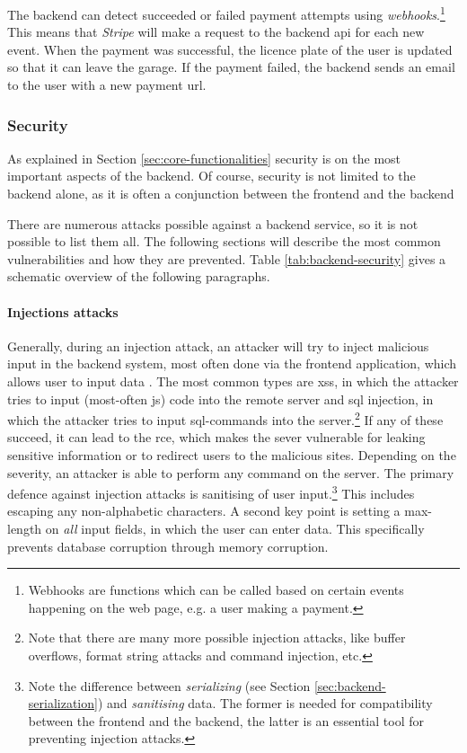 \ind The backend can detect succeeded or failed payment attempts using \textit{webhooks}.\footnote{Webhooks are functions which can be called based on certain events happening on the web page, e.g. a user making a payment.} This means that \textit{Stripe} will make a request to the backend \ac{api} for each new event. When the payment was successful, the licence plate of the user is updated so that it can leave the garage. If the payment failed, the backend sends an email to the user with a new payment \ac{url}.


\subsubsection{Security}\label{subsec:sucurity}
As explained in Section \ref{sec:core-functionalities} security is on the most important aspects of the backend. Of course, security is not limited to the backend alone, as it is often a conjunction between the frontend and the backend

There are numerous attacks possible against a backend service, so it is not possible to list them all. The following sections will describe the most common vulnerabilities and how they are prevented. Table \ref{tab:backend-security} gives a schematic overview of the following paragraphs.

\paragraph{Injections attacks}
Generally, during an injection attack, an attacker will try to inject malicious input in the backend system, most often done via the frontend application, which allows user to input data \cite{injection_attacks}. The most common types are \ac{xss}, in which the attacker tries to input (most-often \ac{js}) code into the remote server and \ac{sql} injection, in which the attacker tries to input \ac{sql}-commands into the server.\footnote{Note that there are many more possible injection attacks, like buffer overflows, format string attacks and command injection, etc.} If any of these succeed, it can lead to the \ac{rce}, which makes the sever vulnerable for leaking sensitive information or to redirect users to the malicious sites. Depending on the severity, an attacker is able to perform any command on the server. The primary defence  against injection attacks is sanitising of user input.\footnote{Note the difference between \textit{serializing} (see Section \ref{sec:backend-serialization}) and \textit{sanitising} data.  The former is needed for compatibility between the frontend and the backend, the latter is an essential tool for preventing injection attacks.} This includes escaping any non-alphabetic characters. A second key point is setting a max-length on \textit{all} input fields, in which the user can enter data. This specifically prevents database corruption through memory corruption.


